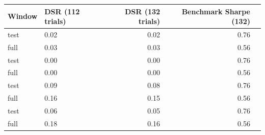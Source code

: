 \begin{tabular}{llrrr}
\toprule
Window & DSR (112 trials) & DSR (132 trials) & Benchmark Sharpe (132) \\
\midrule
test & 0.02 & 0.02 & 0.76 \\
full & 0.03 & 0.03 & 0.56 \\
test & 0.00 & 0.00 & 0.76 \\
full & 0.00 & 0.00 & 0.56 \\
test & 0.09 & 0.08 & 0.76 \\
full & 0.16 & 0.15 & 0.56 \\
test & 0.06 & 0.05 & 0.76 \\
full & 0.18 & 0.16 & 0.56 \\
\bottomrule
\end{tabular}
